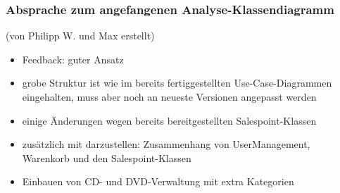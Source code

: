 \documentclass[12pt,a4paper]{article}
\begin{document}
\subsubsection*{Absprache zum angefangenen Analyse-Klassendiagramm}
(von Philipp W. und Max erstellt)
\begin{itemize}
\item Feedback: guter Ansatz
\item grobe Struktur ist wie im bereits fertiggestellten Use-Case-Diagrammen eingehalten, muss aber noch an neueste Versionen angepasst werden
\item einige Änderungen wegen bereits bereitgestellten Salespoint-Klassen
\item zusätzlich mit darzustellen: Zusammenhang von UserManagement, Warenkorb und den Salespoint-Klassen
\item Einbauen von CD- und DVD-Verwaltung mit extra Kategorien
\end{itemize}
\end{document}
